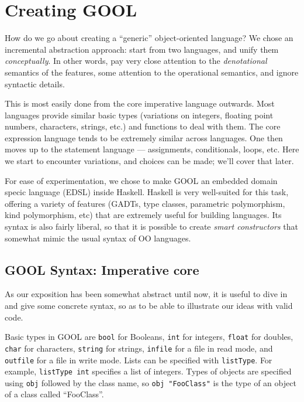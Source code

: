 \documentclass[sigplan,review,anonymous,prologue,dvipsnames]{acmart}
\begin{document}
\section{Creating GOOL} \label{sec:creating}

How do we go about creating a ``generic'' object-oriented language?
We chose an incremental abstraction approach: start from two languages,
and unify them \emph{conceptually}.  In other words, pay very close
attention to the \emph{denotational} semantics of the features, some
attention to the operational semantics, and ignore syntactic details.

This is most easily done from the core imperative language outwards.
Most languages provide similar basic types (variations on integers,
floating point numbers, characters, strings, etc.) and functions to deal
with them. The core expression language tends to be extremely similar
across languages. One then moves up to the statement language ---
assignments, conditionals, loops, etc.  Here we start to encounter
variations, and choices can be made; we'll cover that later.

For ease of experimentation, we chose to make GOOL an embedded
domain specic language (EDSL) inside Haskell.  Haskell is very well-suited
for this task, offering a variety of features (GADTs, type classes,
parametric polymorphism, kind polymorphism, etc) that are extremely useful
for building languages.  Its syntax is also fairly liberal, so that it is
possible to create \emph{smart constructors} that somewhat mimic the
usual syntax of OO languages.

\subsection{GOOL Syntax: Imperative core} \label{ssec:syntax}

As our exposition has been somewhat abstract until now, it is useful to
dive in and give some concrete syntax, so as to be able to illustrate
our ideas with valid code.

Basic types in GOOL are \verb|bool| for Booleans,
\verb|int| for integers, \verb|float| for doubles, \verb|char|
for characters, \verb|string| for strings, \verb|infile| for a file
in read mode, and \verb|outfile| for a file in write mode. Lists can be
specified with \verb|listType|. For example, \verb|listType int|
specifies a list of integers. Types of objects are specified using
\verb|obj| followed by the class name, so \verb|obj "FooClass"| is the type of
an object of a class called ``FooClass''.
\end{document}
